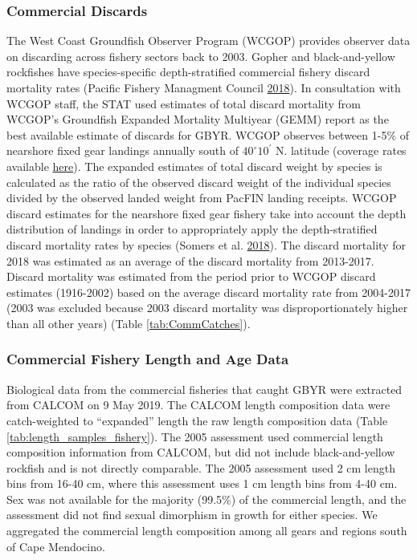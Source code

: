 \documentclass[12pt,]{article}
\begin{document}
\subsubsection{Commercial Discards}\label{commercial-discards}

The West Coast Groundfish Observer Program (WCGOP) provides observer
data on discarding across fishery sectors back to 2003. Gopher and
black-and-yellow rockfishes have species-specific depth-stratified
commercial fishery discard mortality rates (Pacific Fishery Managment
Council \protect\hyperlink{ref-PSMFC2018}{2018}). In consultation with
WCGOP staff, the STAT used estimates of total discard mortality from
WCGOP's Groundfish Expanded Mortality Multiyear (GEMM) report as the
best available estimate of discards for GBYR. WCGOP observes between
1-5\% of nearshore fixed gear landings annually south of
\(40^\circ 10^\prime\) N. latitude (coverage rates available
\href{https://www.nwfsc.noaa.gov/research/divisions/fram/observation/data_products/sector_products.cfm\#ob}{here}).
The expanded estimates of total discard weight by species is calculated
as the ratio of the observed discard weight of the individual species
divided by the observed landed weight from PacFIN landing receipts.
WCGOP discard estimates for the nearshore fixed gear fishery take into
account the depth distribution of landings in order to appropriately
apply the depth-stratified discard mortality rates by species (Somers et
al. \protect\hyperlink{ref-Somers2018}{2018}). The discard mortality for
2018 was estimated as an average of the discard mortality from
2013-2017. Discard mortality was estimated from the period prior to
WCGOP discard estimates (1916-2002) based on the average discard
mortality rate from 2004-2017 (2003 was excluded because 2003 discard
mortality was disproportionately higher than all other years) (Table
\ref{tab:CommCatches}).

\subsubsection{Commercial Fishery Length and Age
Data}\label{commercial-fishery-length-and-age-data}

Biological data from the commercial fisheries that caught GBYR were
extracted from CALCOM on 9 May 2019. The CALCOM length composition data
were catch-weighted to ``expanded'' length the raw length composition
data (Table \ref{tab:length_samples_fishery}). The 2005 assessment used
commercial length composition information from CALCOM, but did not
include black-and-yellow rockfish and is not directly comparable. The
2005 assessment used 2 cm length bins from 16-40 cm, where this
assessment uses 1 cm length bins from 4-40 cm. Sex was not available for
the majority (99.5\%) of the commercial length, and the assessment did
not find sexual dimorphism in growth for either species. We aggregated
the commercial length composition among all gears and regions south of
Cape Mendocino.
\end{document}
